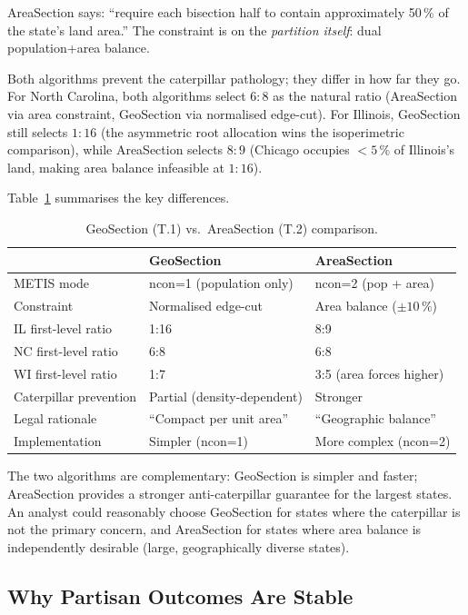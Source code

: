 AreaSection says: ``require each bisection half to contain approximately
50\,\% of the state's land area.''
The constraint is on the \emph{partition itself}: dual population+area balance.

Both algorithms prevent the caterpillar pathology; they differ in how far
they go.
For North Carolina, both algorithms select $6:8$ as the natural ratio
(AreaSection via area constraint, GeoSection via normalised edge-cut).
For Illinois, GeoSection still selects $1:16$ (the asymmetric root allocation
wins the isoperimetric comparison), while AreaSection selects $8:9$
(Chicago occupies $<5$\,\% of Illinois's land, making area balance infeasible
at $1:16$).

Table~\ref{tab:geosection-vs-areasection} summarises the key differences.

\begin{table}[h]
\centering
\caption{GeoSection (T.1) vs.\ AreaSection (T.2) comparison.}
\label{tab:geosection-vs-areasection}
\begin{tabular}{lll}
\toprule
& GeoSection & AreaSection \\
\midrule
METIS mode & ncon=1 (population only) & ncon=2 (pop + area) \\
Constraint & Normalised edge-cut & Area balance ($\pm 10$\,\%) \\
IL first-level ratio & 1:16 & 8:9 \\
NC first-level ratio & 6:8 & 6:8 \\
WI first-level ratio & 1:7 & 3:5 (area forces higher) \\
Caterpillar prevention & Partial (density-dependent) & Stronger \\
Legal rationale & ``Compact per unit area'' & ``Geographic balance'' \\
Implementation & Simpler (ncon=1) & More complex (ncon=2) \\
\bottomrule
\end{tabular}
\end{table}

The two algorithms are complementary: GeoSection is simpler and faster;
AreaSection provides a stronger anti-caterpillar guarantee for the largest
states.
An analyst could reasonably choose GeoSection for states where the caterpillar
is not the primary concern, and AreaSection for states where area balance
is independently desirable (large, geographically diverse states).

\subsection{Why Partisan Outcomes Are Stable}
\label{sec:stability}

